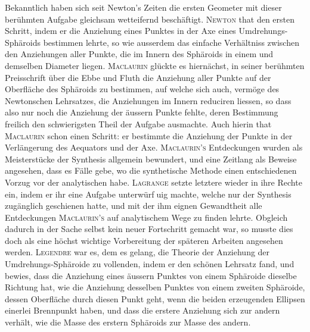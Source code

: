 \documentclass[11pt,a4paper]{article}
\begin{document}
\smallskip
Bekanntlich haben sich seit Newton's Zeiten die ersten Geometer mit dieser berühmten Aufgabe gleichsam wetteifernd beschäftigt. \textsc{Newton} that den ersten Schritt, indem er die Anziehung eines Punktes in der Axe eines Umdrehungs-Sphäroids bestimmen lehrte, so wie ausserdem das einfache Verhältniss zwischen den Anziehungen aller Punkte, die im Innern des Sphäroids in einem und demselben Diameter liegen. \textsc{Maclaurin} glückte es hiernächst, in seiner berühmten Preisschrift über die Ebbe und Fluth die Anziehung aller Punkte auf der Oberfläche des Sphäroids zu bestimmen, auf welche sich auch, vermöge des Newtonschen Lehrsatzes, die Anziehungen im Innern reduciren liessen, so dass also nur noch die Anziehung der äussern Punkte fehlte, deren Bestimmung freilich den schwierigsten Theil der Aufgabe ausmachte. Auch hierin that \textsc{Maclaurin} schon einen Schritt: er bestimmte die Anziehung der Punkte in der Verlängerung des Aequators und der Axe. \textsc{Maclaurin's} Entdeckungen wurden als Meisterstücke der Synthesis allgemein bewundert, und eine Zeitlang als Beweise angesehen, dass es Fälle gebe, wo die synthetische Methode einen entschiedenen Vorzug vor der analytischen habe. \textsc{Lagrange} setzte letztere wieder in ihre Rechte ein, indem er ihr eine Aufgabe unterwürfuig machte, welche nur der Synthesis zugänglich geschienen hatte, und mit der ihm eignen Gewandtheit alle Entdeckungen \textsc{Maclaurin's} auf analytischem Wege zu finden lehrte. Obgleich dadurch in der Sache selbst kein neuer Fortschritt gemacht war, so musste dies doch als eine höchst wichtige Vorbereitung der späteren Arbeiten angesehen werden. \textsc{Legendre} war es, dem es gelang, die Theorie der Anziehung der Umdrehungs-Sphäroide zu vollenden, indem er den schönen Lehrsatz fand, und bewies, dass die Anziehung eines äussern Punktes von einem Sphäroide dieselbe Richtung hat, wie die Anziehung desselben Punktes von einem zweiten Sphäroide, dessen Oberfläche durch diesen Punkt geht, wenn die beiden erzeugenden Ellipsen einerlei Brennpunkt haben, und dass die erstere Anziehung sich zur andern verhält, wie die Masse des erstern Sphäroids zur Masse des andern.
\end{document}
